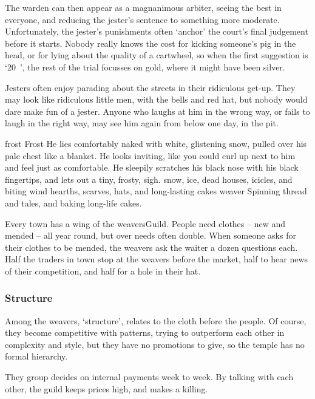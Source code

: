 \begin{multicols}{2}
The \gls{warden} can then appear as a magnanimous arbiter, seeing the best in everyone, and reducing the jester's sentence to something more moderate.
Unfortunately, the jester's punishments often `anchor' the court's final judgement before it starts.
Nobody really knows the cost for kicking someone's pig in the head, or for lying about the quality of a cartwheel, so when the first suggestion is `20~', the rest of the trial focusses on gold, where it might have been silver.

Jesters often enjoy parading about the streets in their ridiculous get-up.
They may look like ridiculous little men, with the bells and red hat, but nobody would dare make fun of a jester.
Anyone who laughs at him in the wrong way, or fails to laugh in the right way, may see him again from below one day, in the pit.

  {\gls{frost}}%
  {Frost}%
  {
    He lies comfortably naked with white, glistening snow, pulled over his pale chest like a blanket.
    He looks inviting, like you could curl up next to him and feel just as comfortable.
    He sleepily scratches his black nose with his black fingertips, and lets out a tiny, frosty, {\sffamily sigh}.
  }%
  {snow, ice, dead houses, icicles, and biting wind}%
  {hearths, scarves, hats, and long-lasting cakes}%
  {\Gls{weaver}}%
  {
    Spinning thread and tales, and baking long-life cakes.
  }%

Every town has a wing of the \gls{weaversGuild}.
People need clothes -- new and mended -- all year round, but over needs often double.
When someone asks for their clothes to be mended, the weavers ask the waiter a dozen questions each.
Half the traders in town stop at the weavers before the market, half to hear news of their competition, and half for a hole in their hat.

\subsubsection{Structure}

Among the weavers, `structure', relates to the cloth before the people.
Of course, they become competitive with patterns, trying to outperform each other in complexity and style, but they have no promotions to give, so the temple has no formal hierarchy.

They group decides on internal payments week to week.
By talking with each other, the guild keeps prices high, and makes a killing.


\end{multicols}
